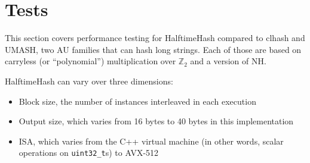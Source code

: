 \documentclass[sigconf, nonacm]{acmart}
\newcommand{\ints}{\mathbb{Z}}
\begin{document}







\section{Tests}

This section covers performance testing for HalftimeHash compared to clhash and UMASH, two AU families that can hash long strings.
Each of those are based on carryless (or ``polynomial'') multiplication over $\ints_2$ and a version of NH.

HalftimeHash can vary over three dimensions:

\begin{itemize}
\item Block size, the number of instances interleaved in each execution
\item Output size, which varies from 16 bytes to 40 bytes in this implementation
\item ISA, which varies from the C++ virtual machine (in other words, scalar operations on \texttt{uint32\_t}s) to AVX-512
\end{itemize}
\end{document}
